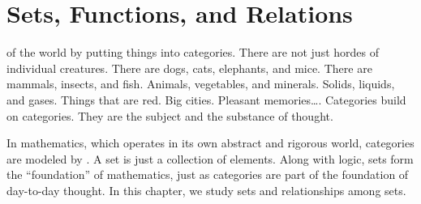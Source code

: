 \chapter{Sets, Functions, and Relations}\label{C-sets}

 of the world by putting
things into categories.  There are not just hordes of individual
creatures.  There are dogs, cats, elephants, and mice.  There are
mammals, insects, and fish.  Animals, vegetables, and minerals.
Solids, liquids, and gases.  Things that are red.  Big cities.
Pleasant memories\dots.  Categories build on categories.  They are the
subject and the substance of thought.

In mathematics, which operates in its own abstract and rigorous world,
categories are modeled by .  A set is just a collection of
elements.  Along with logic, sets form the ``foundation'' of
mathematics, just as categories are part of the foundation of
day-to-day thought.  In this chapter, we study sets and relationships
among sets.




\endinput

